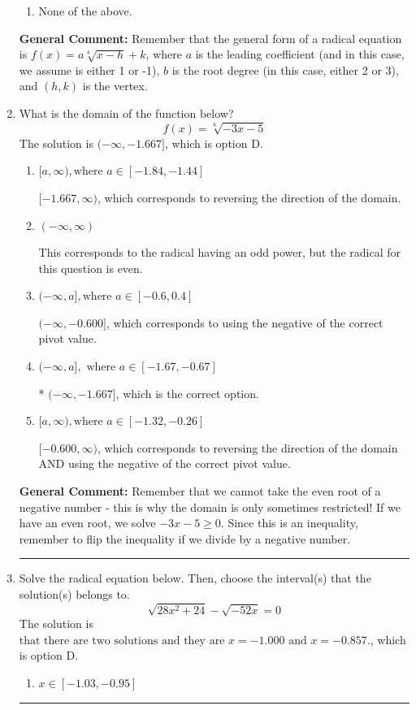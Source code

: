\documentclass{extbook}[14pt]
\newcommand{\litem}[1]{\item #1

\rule{\textwidth}{0.4pt}}
\begin{document}
\begin{enumerate}
{\begin{enumerate}[label=\Alph*.]
\begin{multicols}{2}
\end{multicols}\item None of the above.\end{enumerate}
\textbf{General Comment:} Remember that the general form of a radical equation is $ f(x) = a \sqrt[b]{x - h} + k $, where $a$ is the leading coefficient (and in this case, we assume is either 1 or -1), $b$ is the root degree (in this case, either 2 or 3), and $(h, k)$ is the vertex.
}
\litem{
What is the domain of the function below?
\[ f(x) = \sqrt[6]{-3 x - 5} \]The solution is \( (-\infty, -1.667] \), which is option D.\begin{enumerate}[label=\Alph*.]
\item \( [a, \infty), \text{where } a \in [-1.84, -1.44] \)

 $[-1.667, \infty)$, which corresponds to reversing the direction of the domain.
\item \( (-\infty, \infty) \)

This corresponds to the radical having an odd power, but the radical for this question is even.
\item \( (-\infty, a], \text{where } a \in [-0.6, 0.4] \)

$(-\infty, -0.600]$, which corresponds to using the negative of the correct pivot value.
\item \( (-\infty, a], \text{ where } a \in [-1.67, -0.67] \)

* $(-\infty, -1.667]$, which is the correct option.
\item \( [a, \infty), \text{where } a \in [-1.32, -0.26] \)

$[-0.600, \infty)$, which corresponds to reversing the direction of the domain AND using the negative of the correct pivot value.
\end{enumerate}

\textbf{General Comment:} Remember that we cannot take the even root of a negative number - this is why the domain is only sometimes restricted! If we have an even root, we solve $-3 x - 5 \geq 0$. Since this is an inequality, remember to flip the inequality if we divide by a negative number.
}
\litem{
Solve the radical equation below. Then, choose the interval(s) that the solution(s) belongs to.
\[ \sqrt{28 x^2 + 24} - \sqrt{-52 x} = 0 \]The solution is \( \text{that there are two solutions and they are } x = -1.000 \text{ and } x = -0.857. \), which is option D.\begin{enumerate}[label=\Alph*.]
\item \( x \in [-1.03,-0.95] \)


\end{enumerate}}
\end{enumerate}
\end{document}
